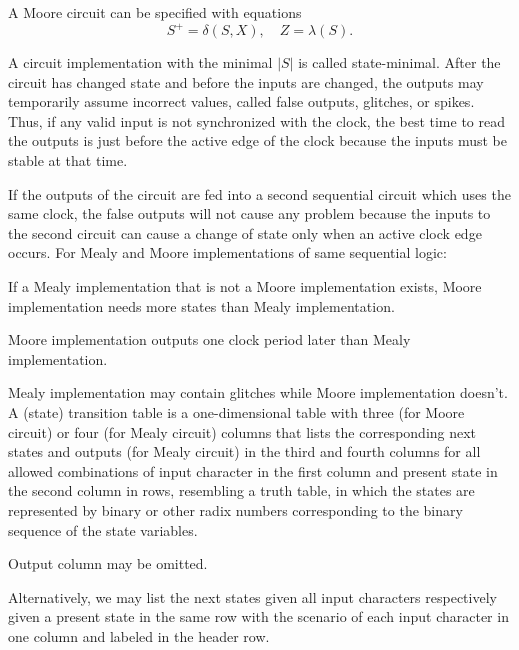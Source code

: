 \documentclass[a4paper,12pt]{report}
\begin{document}
A Moore circuit can be specified with equations
\[S^+=\delta(S,X),\quad Z=\lambda(S).\]

A circuit implementation with the minimal $|S|$ is called state-minimal.
After the circuit has changed state and before the inputs are changed, the outputs may temporarily assume incorrect values, called false outputs, glitches, or spikes. Thus, if any valid input is not synchronized with the clock, the best time to read the outputs is just before the active edge of the clock because the inputs must be stable at that time.

If the outputs of the circuit are fed into a second sequential circuit which uses the same clock, the false outputs will not cause any problem because the inputs to the second circuit can cause a change of state only when an active clock edge occurs.
For Mealy and Moore implementations of same sequential logic:
\bit
\item If a Mealy implementation that is not a Moore implementation exists, Moore implementation needs more states than Mealy implementation.
\item Moore implementation outputs one clock period later than Mealy implementation.
\item Mealy implementation may contain glitches while Moore implementation doesn't.
\eit
{}
A (state) transition table is a one-dimensional table with three (for Moore circuit) or four (for Mealy circuit) columns that lists the corresponding next states and outputs (for Mealy circuit) in the third and fourth columns for all allowed combinations of input character in the first column and present state in the second column in rows, resembling a truth table, in which the states are represented by binary or other radix numbers corresponding to the binary sequence of the state variables.

Output column may be omitted.

Alternatively, we may list the next states given all input characters respectively given a present state in the same row with the scenario of each input character in one column and labeled in the header row.
\end{document}
